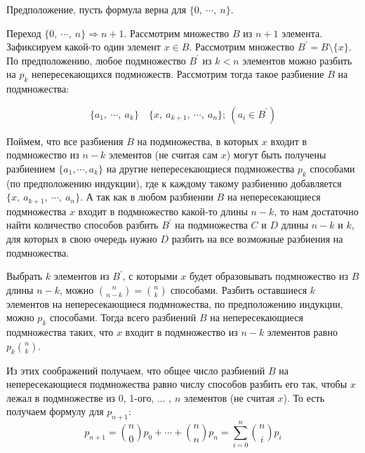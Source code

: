 \documentclass{article}
\begin{document}
	Предположение, пусть формула верна для $\{0,\ \cdots,\ n\}$.
	
	Переход $\{0,\ \cdots,\ n\} \Rightarrow n + 1$.
	Рассмотрим множество $B$ из $n + 1$ элемента. Зафиксируем какой-то один элемент $x \in B$. Рассмотрим множество $B^{\prime} = B \setminus \{x\}$. По предположению, любое подмножество $B^{\prime}$ из $k < n$ элементов можно разбить на $p_k$ непересекающихся подмножеств. Рассмотрим тогда такое разбиение $B$ на подмножества:
	
	$$\{a_1,\ \cdots,\ a_k\} \quad \{x,\ a_{k + 1},\ \cdots,\ a_{n}\};\ (a_i \in B^{\prime})$$
	
	Поймем, что все разбиения $B$ на подмножества, в которых $x$ входит в подмножество из $n - k$ элементов (не считая сам $x$)  могут быть получены разбиением $ \{a_1, \cdots,a_k\} $ на другие непересекающиеся подмножества $p_k$ способами (по предположению индукции), где к каждому такому разбиению добавляется $\{x,\ a_{k + 1},\ \cdots,\ a_{n}\}$. А так как в любом разбиении $B$ на непересекающиеся подмножества $x$ входит в подмножество какой-то длины $n - k$, то нам достаточно найти количество способов разбить $B^{\prime}$ на подмножества $C$ и $D$ длины $n - k$ и $k$, для которых в свою очередь нужно $D$ разбить на все возможные разбиения на подмножества.
	
	Выбрать $k$ элементов из $B^{\prime}$, с которыми $x$ будет образовывать подмножество из $B$ длины $n - k$, можно ${n \choose n - k} = {n \choose k} $ способами. Разбить оставшиеся $k$ элементов на непересекающиеся подмножества, по предположению индукции, можно $p_{k}$ способами. Тогда всего разбиений $B$ на непересекающиеся подмножества таких, что $x$ входит в подмножество из $n - k$ элементов равно $p_{k} {n \choose k}$.
	
	Из этих соображений получаем, что общее число разбиений $B$ на непересекающиеся подмножества равно числу способов разбить его так, чтобы $x$ лежал в подмножестве из 0, 1-ого, ... , $n$ элементов (не считая $x$). То есть получаем формулу для $p_{n + 1}$: 
	$$ p_{n+1} = {n \choose 0} p_0 + \cdots + {n \choose n} p_n= \sum_{i=0}^{n} {n \choose i} p_i$$    
\end{document}
